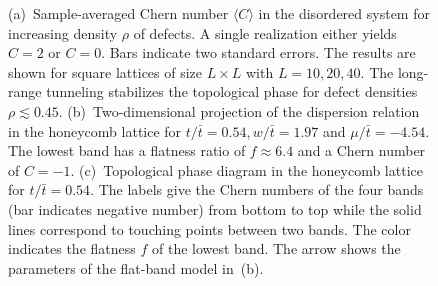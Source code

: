\begin{figure}[ht]
    \centering
    \hspace{0.1cm}

    \caption{
        (a)~Sample-averaged Chern number $\langle C \rangle$ in the disordered system for increasing density $\rho$ of defects.
        A single realization either yields $C=2$ or $C=0$.
        Bars indicate two standard errors.
        The results are shown for square lattices of size $L \times L$ with $L=10, 20, 40$.
        The long-range tunneling stabilizes the topological phase for defect densities $\rho \lesssim 0.45$.
        (b)~Two-dimensional projection of the dispersion relation in the honeycomb lattice for $t/\bar{t}=0.54, w/\bar{t}=1.97$ and $\mu/\bar{t}=-4.54$.
        The lowest band has a flatness ratio of $f\approx 6.4$ and a Chern number of $C=-1$.
        (c)~Topological phase diagram in the honeycomb lattice for $t/\bar{t}=0.54$.
        The labels give the Chern numbers of the four bands (bar indicates negative number) from bottom to top while the solid lines correspond to touching points between two bands.
        The color indicates the flatness $f$ of the lowest band.
        The arrow shows the parameters of the flat-band model in~(b).
    }
\end{figure}


